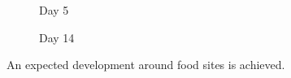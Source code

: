 \documentclass[a4paper,prd,twocolumn,nofootinbib,superscriptaddress,floatfix]{revtex4}
\begin{document}
\begin{figure}[H] 
\centering
    \caption{Day 5} 
    \label{fig:6a} 
    \vspace{4ex}


    \caption{Day 14} 
    \label{fig:6b} 
    \vspace{4ex}
  
  
 
  \label{fig:6} 
\end{figure}

 An expected development around food sites is achieved.
\end{document}
